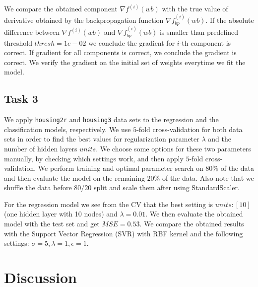 \documentclass[fleqn,moreauthors,10pt]{ds_report}
\begin{document}
We compare the obtained component $\nabla f^{(i)}(wb)$ with the true value of derivative obtained by the backpropagation function $\nabla f^{(i)}_{bp}(wb)$. If the absolute difference between $\nabla f^{(i)}(wb)$ and $\nabla f^{(i)}_{bp}(wb)$ is smaller than predefined threshold $thresh = 1e-02$ we conclude the gradient for $i$-th component is correct. If gradient for all components is correct, we conclude the gradient is correct. We verify the gradient on the initial set of weights everytime we fit the model.

\subsection*{Task 3}
We apply \texttt{housing2r} and \texttt{housing3} data sets to the regression and the classification models, respectively. We use $5$-fold cross-validation for both data sets in order to find the best values for regularization parameter $\lambda$ and the number of hidden layers $units$. We choose some options for these two parameters manually, by checking which settings work, and then apply $5$-fold cross-validation. We perform training and optimal parameter search on $80 \%$ of the data and then evaluate the model on the remaining $20\%$ of the data. Also note that we shuffle the data before $80/20$ split and scale them after using StandardScaler. 

For the regression model we see from the CV that the best setting is $units: [10]$ (one hidden layer with 10 nodes) and $\lambda = 0.01$. We then evaluate the obtained model with the test set and get $MSE = 0.53$. We compare the obtained results with the Support Vector Regression (SVR) with RBF kernel and the following settings: $\sigma = 5, \lambda = 1, \epsilon = 1$. 




\section*{Discussion}





%
%
\end{document}
